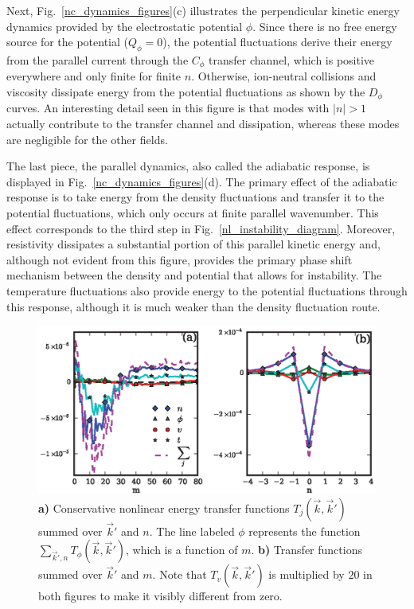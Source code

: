 \documentclass[showpacs,preprintnumbers,amsmath,amssymb,superscriptaddress]{revtex4}
\begin{document}
Next, Fig.~\ref{nc_dynamics_figures}(c) illustrates the perpendicular kinetic energy dynamics provided by the electrostatic potential $\phi$. 
Since there is no free energy source for the potential ($Q_\phi=0$),
the potential fluctuations derive their energy from the parallel current through the $C_\phi$ transfer channel, which is positive everywhere and only finite for finite $n$. Otherwise, ion-neutral
collisions and viscosity dissipate energy from the potential fluctuations as shown by the $D_\phi$ curves. An interesting detail seen in this figure is that modes with $|n| > 1$ actually
contribute to the transfer channel and dissipation, whereas these modes are negligible for the other fields. 

The last piece, the parallel dynamics, also called the adiabatic response, is displayed in Fig.~\ref{nc_dynamics_figures}(d). 
The primary effect of the adiabatic response is to take energy from the density
fluctuations and transfer it to the potential fluctuations, which only occurs at finite parallel wavenumber. This effect corresponds to the third step in Fig.~\ref{nl_instability_diagram}.
Moreover, resistivity dissipates a substantial portion of this
parallel kinetic energy and, although not evident from this figure, provides
the primary phase shift mechanism between the density and potential that allows for instability. The temperature fluctuations also provide energy to the potential fluctuations
through this response, although it is much weaker than the density fluctuation route. 


\begin{figure}[!htbp]
\includegraphics[]{nl_dynamics}
\hfil
\caption{\textbf{a)} Conservative nonlinear energy transfer functions $T_j(\vec{k},\vec{k}')$ summed over $\vec{k}'$ and $n$. 
The line labeled $\phi$ represents the function $\sum_{\vec{k}',n} T_\phi(\vec{k},\vec{k}')$,
which is a function of $m$. 
\textbf{b)} Transfer functions summed over $\vec{k}'$ and $m$. Note that $T_v(\vec{k},\vec{k}')$ is multiplied by $20$ in both figures to make it visibly different from zero.}
\label{conservative_transfers}
\end{figure}
\end{document}
